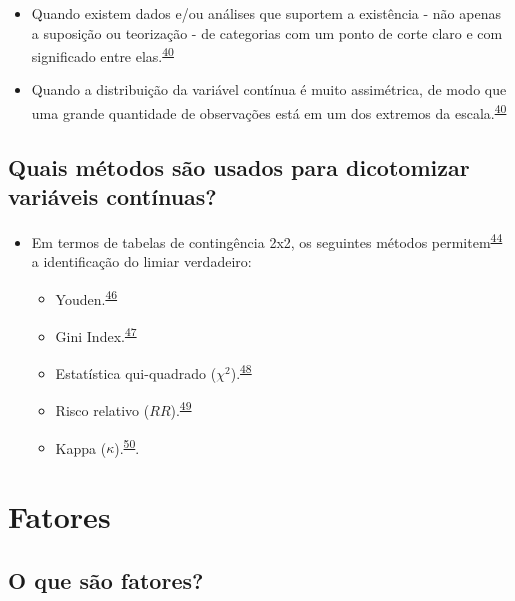 \documentclass[
]{book}
\begin{document}
\begin{itemize}
\item
  Quando existem dados e/ou análises que suportem a existência - não apenas a suposição ou teorização - de categorias com um ponto de corte claro e com significado entre elas.\textsuperscript{\protect\hyperlink{ref-MacCallum2002}{40}}
\item
  Quando a distribuição da variável contínua é muito assimétrica, de modo que uma grande quantidade de observações está em um dos extremos da escala.\textsuperscript{\protect\hyperlink{ref-MacCallum2002}{40}}
\end{itemize}

\hypertarget{quais-muxe9todos-suxe3o-usados-para-dicotomizar-variuxe1veis-contuxednuas}{%
\subsection{Quais métodos são usados para dicotomizar variáveis contínuas?}\label{quais-muxe9todos-suxe3o-usados-para-dicotomizar-variuxe1veis-contuxednuas}}

\begin{itemize}
\item
  Em termos de tabelas de contingência 2x2, os seguintes métodos permitem\textsuperscript{\protect\hyperlink{ref-Prince2017}{44}} a identificação do limiar verdadeiro:

  \begin{itemize}
  \item
    Youden.\textsuperscript{\protect\hyperlink{ref-YOUDEN1950}{46}}
  \item
    Gini Index.\textsuperscript{\protect\hyperlink{ref-strobl2007}{47}}
  \item
    Estatística qui-quadrado (\(\chi^2\)).\textsuperscript{\protect\hyperlink{ref-pearson1900}{48}}
  \item
    Risco relativo (\(RR\)).\textsuperscript{\protect\hyperlink{ref-Greiner2000}{49}}
  \item
    Kappa (\(\kappa\)).\textsuperscript{\protect\hyperlink{ref-fleiss1971}{50}}.
  \end{itemize}
\end{itemize}

\hypertarget{fatores}{%
\section{Fatores}\label{fatores}}

\hypertarget{o-que-suxe3o-fatores}{%
\subsection{O que são fatores?}\label{o-que-suxe3o-fatores}}
\end{document}
